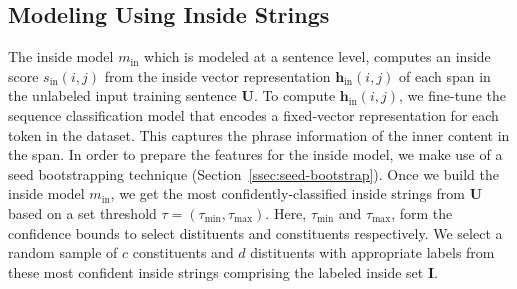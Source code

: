 \documentclass[11pt]{article}
\newcommand{\ignore}[1]{}
\begin{document}
\subsection{Modeling Using Inside Strings}
\label{ssec:inside-algorithm}
The inside model $m_{\text{in}}$ which is modeled at a sentence level, computes an inside score $s_{\text{in}}{(i,j)}$ from the inside vector representation ${\boldsymbol{h}_{\text{in}}(i,j)}$ of each span in the unlabeled input training sentence $\mathcal{\mathbf{U}}$. To compute ${\boldsymbol{h}_{\text{in}}(i,j)}$, we fine-tune the sequence classification model that encodes a fixed-vector representation for each token in the dataset.\ignore{$\leftarrow$ I think the reviewers intention here was that it needs to be clear what you use - in this case ROBERTa, so maybe just briefly mention ROBERTa in a footnote and say that it will become more clear later. finally, that sentence "To compute..." is not clear to me. Can you explain to me in an email what you mean?} This captures the phrase information of the inner content in the span. In order to prepare the features for the inside model, we make use of a seed bootstrapping technique (Section~\ref{ssec:seed-bootstrap}). Once we build the inside model $m_{\text{in}}$, we get the most confidently-classified inside strings from $\mathcal{\mathbf{U}}$ based on a set threshold $\tau=(\tau_{\text{min}}, \tau_{\text{max}})$. Here, $\tau_{\text{min}}$ and $\tau_{\text{max}}$, form the confidence bounds to select distituents and constituents respectively. We select a random sample of $c$ constituents and $d$ distituents with appropriate labels from these most confident inside strings comprising the labeled inside set $\mathcal{\mathbf{I}}$.
\end{document}
